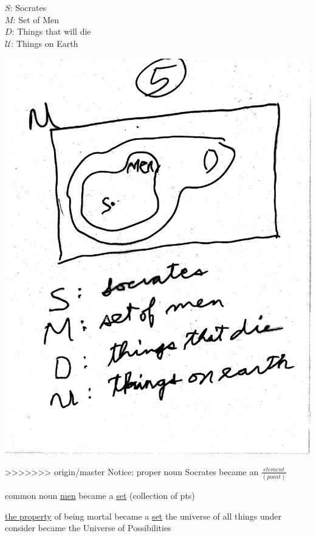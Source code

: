 \documentclass[10pt,a4paper]{article}
\begin{document}
$S$: Socrates\\
$M$: Set of Men\\
$D$: Things that will die\\
$\mathcal{U}$: Things on Earth

\includegraphics[scale=.5]{Pages/ST_5} 



>>>>>>> origin/master
\newpage
Notice:
proper noun Socrates 
became an $\frac {element} {(point)}$

common noun \underline{men}
became a \underline{set}
(collection of pts)

\underline{the property} of being mortal became a \underline{set} the universe of all things under consider became the Universe of Possibilities 
\end{document}
